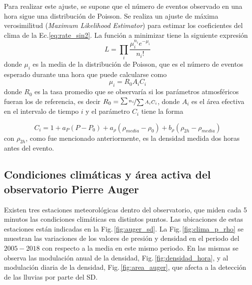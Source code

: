 Para realizar este ajuste, se supone que el número de eventos observado en una hora sigue una distribución de Poisson. Se realiza un ajuste de máxima verosimilitud (\emph{Maximum Likelihood Estimator}) para estimar los coeficientes del clima de la Ec.\ref{eq:rate_sin2}. La función a minimizar tiene la siguiente expresión 
\begin{equation}
	L=\prod_i\frac{\mu_i^{n_i} e^{-\mu_i}}{n_i!}
\end{equation}
donde $\mu_i$ es la media de la distribución de Poisson, que es el número de eventos esperado durante una hora que puede calcularse como
\begin{equation}
	\mu_i = R_0A_iC_i
\end{equation}
donde $R_0$ es la tasa promedio que se observaría si los parámetros atmosféricos fueran los de referencia, es decir $R_0=\nicefrac{\sum n_i}{\sum A_iC_i}$, donde $A_i$ es el área efectiva en el intervalo de tiempo $i$ y el parámetro $C_i$ tiene la forma

\begin{equation}
	C_i = 1+a_P(P-P_0) +a_{\rho}(\rho_{media}-\rho_0) + b_{\rho}(\rho_{2h}-\rho_{media}) 
\end{equation}
con $\rho_{2h}$, como fue mencionado anteriormente, es la densidad medida dos horas antes del evento.

\subsection{Condiciones climáticas y área activa del observatorio Pierre Auger}

Existen tres estaciones meteorológicas dentro del observatorio, que miden cada 5 minutos las condiciones climáticas en distintos puntos. Las ubicaciones de estas estaciones están indicadas en la Fig.\,\ref{fig:auger_sd}. La Fig.\,\ref{fig:clima_p_rho} se muestran las variaciones de los valores de presión y densidad en el periodo del $2005-2018$ con respecto a la media en este mismo periodo. En las mismas se observa las modulación anual de la densidad, Fig.\,\ref{fig:densidad_hora}, y al modulación diaria de la densidad, Fig.\,\ref{fig:area_auger}, que afecta a la detección de las lluvias por parte del SD. 

